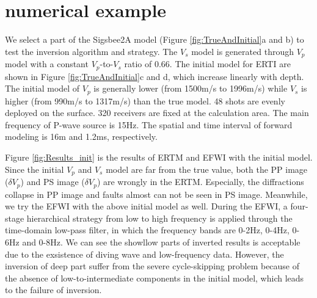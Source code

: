 \section{numerical example}
We select a part of the Sigsbee2A model (Figure
\ref{fig:TrueAndInitial}a and b) to test the inversion algorithm and strategy.
The $V_s$ model is generated through $V_p$ model with a constant $V_p$-to-$V_s$ ratio of 0.66. 
The initial model for ERTI are shown in 
Figure \ref{fig:TrueAndInitial}c and d, which increase linearly with depth.
The initial model of $V_p$ is generally lower (from 1500m/s to 1996m/s) while 
$V_s$ is higher  (from 990m/s to 1317m/s) than the true model. 
48 shots are evenly deployed on the surface.
320 receivers are fixed at the calculation area.
The main frequency of P-wave source is 15Hz.
The spatial and time interval of forward modeling is 16m and 1.2ms, respectively.

Figure \ref{fig:Results_init} is the results of ERTM and EFWI with the initial model.
Since the initial
$V_p$ and $V_s$ model are far from the true value, both the PP image ($\delta V_p$) and PS
image ($\delta V_p$) are wrongly 
in the ERTM. Especially, the diffractions collapse in PP image and faults almost can not be seen
in PS image. Meanwhile, we try the EFWI with the above initial model as well. 
During the EFWI, 
a four-stage hierarchical strategy 
from low to high frequency is applied through the time-domain low-pass filter, in which the frequency bands
are 0-2Hz, 0-4Hz, 0-6Hz and 0-8Hz. 
We can see the showllow parts of inverted results 
is acceptable due to the exsistence of diving wave and low-frequency data. However, the inversion of
deep part suffer from the severe cycle-skipping problem because of the absence of
low-to-intermediate components in the initial model, which leads to the failure of inversion.

